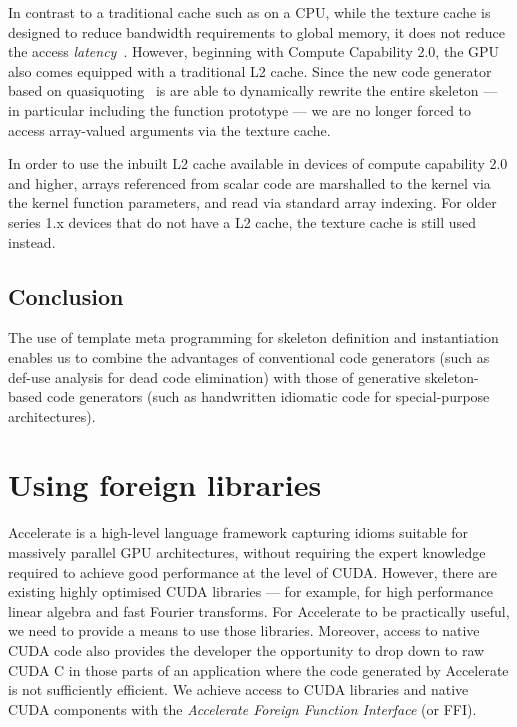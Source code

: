 In contrast to a traditional cache such as on a CPU, while the texture cache is
designed to reduce bandwidth requirements to global memory, it does not reduce
the access \emph{latency}~\cite[\S5.3.2]{NVIDIA:2012wf}. However, beginning with
Compute Capability 2.0, the GPU also comes equipped with a traditional L2 cache.
Since the new code generator based on quasiquoting~\cite{CliftonEverest:2014vi}
is are able to dynamically rewrite the entire skeleton --- in particular
including the function prototype --- we are no longer forced to access
array-valued arguments via the texture cache.

In order to use the inbuilt L2 cache available in devices of compute capability
2.0 and higher, arrays referenced from scalar code are marshalled to the kernel
via the kernel function parameters, and read via standard array indexing. For
older series 1.x devices that do not have a L2 cache, the texture cache is still
used instead.


\subsection{Conclusion}

The use of template meta programming for skeleton definition and instantiation
enables us to combine the advantages of conventional code generators (such as
def-use analysis for dead code elimination) with those of generative
skeleton-based code generators (such as handwritten idiomatic code for
special-purpose architectures).


\section{Using foreign libraries}

Accelerate is a high-level language framework capturing idioms suitable for
massively parallel GPU architectures, without requiring the expert knowledge
required to achieve good performance at the level of CUDA\@. However, there are
existing highly optimised CUDA libraries --- for example, for high performance
linear algebra and fast Fourier transforms. For Accelerate to be practically
useful, we need to provide a means to use those libraries. Moreover, access to
native CUDA code also provides the developer the opportunity to drop down to raw
CUDA C in those parts of an application where the code generated by Accelerate
is not sufficiently efficient. We achieve access to CUDA libraries and native
CUDA components with the \emph{Accelerate Foreign Function
Interface} (or FFI).

